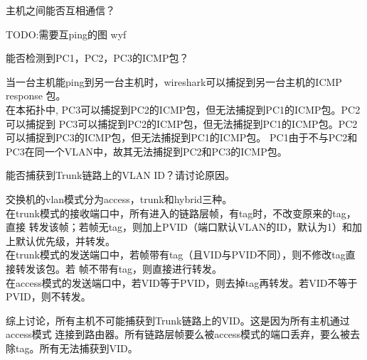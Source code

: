 \documentclass{myreport}
\begin{document}
\begin{tcolorbox}[title = {观察一}]
主机之间能否互相通信？
\end{tcolorbox}
TODO:需要互ping的图
wyf
\begin{tcolorbox}[title = {观察二}]
    能否检测到PC1，PC2，PC3的ICMP包？
\end{tcolorbox}
当一台主机能ping到另一台主机时，wireshark可以捕捉到另一台主机的ICMP response 包。\\ 
在本拓扑中, PC3可以捕捉到PC2的ICMP包，但无法捕捉到PC1的ICMP包。PC2可以捕捉到
PC3可以捕捉到PC2的ICMP包，但无法捕捉到PC1的ICMP包。PC2可以捕捉到PC3的ICMP包，但无法捕捉到PC1的ICMP包。
PC1由于不与PC2和PC3在同一个VLAN中，故其无法捕捉到PC2和PC3的ICMP包。

\begin{tcolorbox}[title = {观察三}]
能否捕获到Trunk链路上的VLAN ID？请讨论原因。
\end{tcolorbox}
交换机的vlan模式分为access，trunk和hybrid三种。\\
在trunk模式的接收端口中，所有进入的链路层帧，有tag时，不改变原来的tag，直接
转发该帧；若帧无tag，则加上PVID（端口默认VLAN的ID，默认为1）和加上默认优先级，并转发。\\
在trunk模式的发送端口中，若帧带有tag（且VID与PVID不同），则不修改tag直接转发该包。若
帧不带有tag，则直接进行转发。\\ 

在access模式的发送端口中，若VID等于PVID，则去掉tag再转发。若VID不等于PVID，则不转发。

综上讨论，所有主机不可能捕获到Trunk链路上的VID。这是因为所有主机通过access模式
连接到路由器。所有链路层帧要么被access模式的端口丢弃，要么被去除tag。所有无法捕获到VID。
\end{document}
